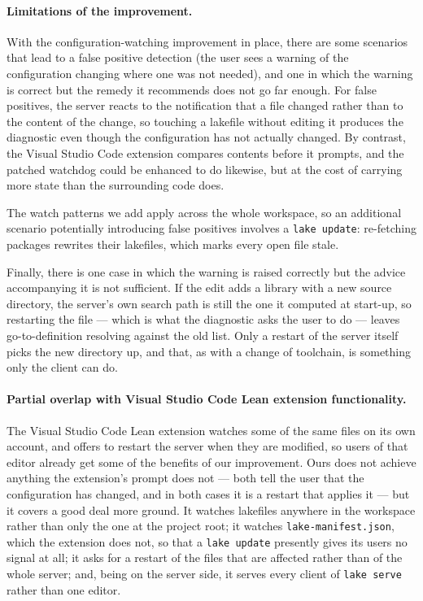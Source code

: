 \documentclass{article}
\newcommand{\Lean}{Lean\xspace}      %
\begin{document}
\paragraph{Limitations of the improvement.}
With the configuration-watching improvement in place, there are some scenarios that lead to a false positive detection (the user sees a warning of the configuration changing where one was not needed), and one in which the warning is correct but the remedy it recommends does not go far enough.
For false positives, the server reacts to the notification that a file changed rather than to the content of the change, so touching a lakefile without editing it produces the diagnostic even though the configuration has not actually changed. By contrast, the Visual Studio Code extension compares contents before it prompts, and the patched watchdog could be enhanced to do likewise, but at the cost of carrying more state than the surrounding code does. 

The watch patterns we add apply across the whole workspace, so an additional scenario potentially introducing false positives involves a \texttt{lake update}: re-fetching packages rewrites their lakefiles, which marks every open file stale. 

Finally, there is one case in which the warning is raised correctly but the advice accompanying it is not sufficient. If the edit adds a library with a new source directory, the server's own search path is still the one it computed at start-up, so restarting the file --- which is what the diagnostic asks the user to do --- leaves go-to-definition resolving against the old list. Only a restart of the server itself picks the new directory up, and that, as with a change of toolchain, is something only the client can do.

\paragraph{Partial overlap with Visual Studio Code \Lean extension functionality.}
The Visual Studio Code \Lean extension watches some of the same files on its own account, and offers to restart the server when they are modified, so users of that editor already get some of the benefits of our improvement. Ours does not achieve anything the extension's prompt does not --- both tell the user that the configuration has changed, and in both cases it is a restart that applies it --- but it covers a good deal more ground. It watches lakefiles anywhere in the workspace rather than only the one at the project root; it watches \texttt{lake-manifest.json}, which the extension does not, so that a \texttt{lake update} presently gives its users no signal at all; it asks for a restart of the files that are affected rather than of the whole server; and, being on the server side, it serves every client of \texttt{lake serve} rather than one editor.
\end{document}
